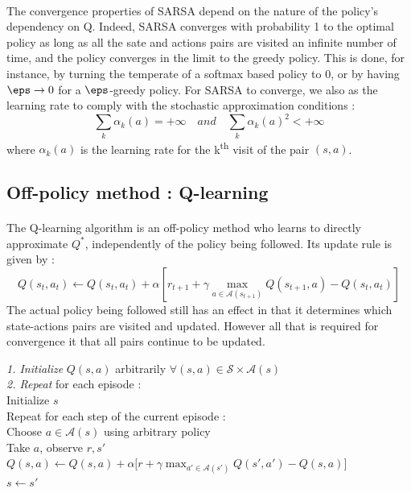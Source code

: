 \documentclass[a4paper]{report}
\begin{document}
{{{					\paragraph{} The convergence properties of SARSA depend on the nature of the policy's dependency on Q. Indeed, SARSA converges with probability 1 to the optimal policy as long as all the sate and actions pairs are visited an infinite number of time, and the policy converges in the limit to the greedy policy. This is done, for instance, by turning the temperate of a softmax based policy to 0, or by having $\eps\to 0$ for a $\eps$-greedy policy. For SARSA to converge, we also as the learning rate to comply with the stochastic approximation conditions : 
					\begin{equation}
						\sum_k \alpha_k(a) = +\infty \quad { and } \quad \sum_k \alpha_k(a)^2 < +\infty
					\end{equation}
					where $\alpha_k(a)$ is the learning rate for the k\textsuperscript{th} visit of the pair $(s,a)$. 
					
			}
			\subsection{Off-policy method : Q-learning}
			{
				\paragraph{} The Q-learning algorithm is an off-policy method who learns to directly approximate $Q^*$, independently of the policy being followed. Its update rule is given by :
				\begin{equation}
					Q(s_t,a_t) \leftarrow Q(s_t,a_t) + \alpha \left[ r_{t+1} + \gamma \max_{a\in\mathcal{A}(s_{t+1})} Q(s_{t+1},a) - Q(s_t,a_t)\right]
				\end{equation}
				The actual policy being followed still has an effect in that it determines which state-actions pairs are visited and updated. However all that is required for convergence it that all pairs continue to be updated. 
				\vspace{10pt}
				
					{
						\begin{algorithm}[H]
	 					\SetAlgoLined
						\LinesNumbered
						\emph{\textsf{1. Initialize}} $Q(s,a)$ arbitrarily $\forall (s,a)\in\mathcal{S}\times\mathcal{A}(s)$ \\
						\BlankLine
						\BlankLine
						\emph{\textsf{2. Repeat}} for each episode : \\
						\Indp \Indp 
							Initialize $s$ \\
							Repeat for each step of the current episode :   \\
							\Indp \Indp 
								Choose $a\in\mathcal{A}(s)$ using arbitrary policy \\
								Take $a$, observe $r,s'$ \\
								$ Q(s,a) \longleftarrow Q(s,a) + \alpha\big[ r + \gamma \max_{a'\in\mathcal{A}(s')}Q(s',a') - Q(s,a) \big]$ \\
								$s\leftarrow s' $ \\
								

\end{algorithm}}}}}
\end{document}
